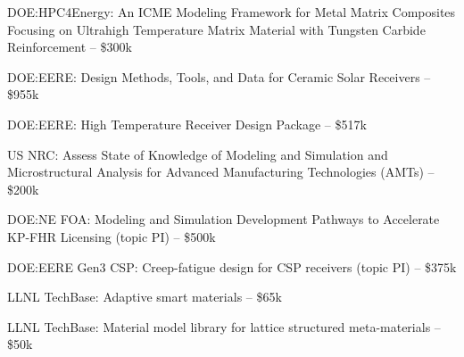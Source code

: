 DOE:HPC4Energy: An ICME Modeling Framework for Metal Matrix Composites Focusing on Ultrahigh Temperature Matrix Material with Tungsten Carbide Reinforcement -- \$300k 

DOE:EERE: Design Methods, Tools, and Data for Ceramic Solar Receivers -- \$955k 

DOE:EERE: High Temperature Receiver Design Package -- \$517k 

US NRC: Assess State of Knowledge of Modeling and Simulation and Microstructural Analysis for Advanced Manufacturing Technologies (AMTs) -- \$200k 

DOE:NE FOA: Modeling and Simulation Development Pathways to Accelerate KP-FHR Licensing (topic PI) -- \$500k 

DOE:EERE Gen3 CSP: Creep-fatigue design for CSP receivers (topic PI) -- \$375k 

LLNL TechBase: Adaptive smart materials -- \$65k 

LLNL TechBase: Material model library for lattice structured meta-materials
-- \$50k 

\extra


\nocite{*}


\printbibliography[keyword=refereed,heading=none]


\printbibliography[keyword=pending,heading=none]


\printbibliography[keyword=conf,heading=none]


\printbibliography[keyword=patents,heading=none]


\printbibliography[keyword=nonref,heading=none]


\printbibliography[keyword=invited,heading=none]



